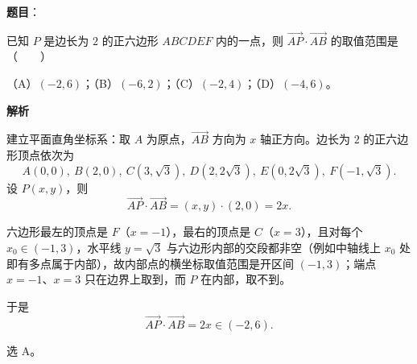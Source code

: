 \begin{answer}

\textbf{题目}：

已知 $P$ 是边长为 $2$ 的正六边形 $ABCDEF$ 内的一点，则 $\overrightarrow{AP}\cdot\overrightarrow{AB}$ 的取值范围是\mbox{（　　）}

（A）$(-2,6)$；（B）$(-6,2)$；（C）$(-2,4)$；（D）$(-4,6)$。

\textbf{解析}

建立平面直角坐标系：取 $A$ 为原点，$\overrightarrow{AB}$ 方向为 $x$ 轴正方向。边长为 $2$ 的正六边形顶点依次为
\nopagebreak[4]
\[A(0,0),\ B(2,0),\ C(3,\sqrt3),\ D(2,2\sqrt3),\ E(0,2\sqrt3),\ F(-1,\sqrt3).\]
设 $P(x,y)$，则
\nopagebreak[4]
\[\overrightarrow{AP}\cdot\overrightarrow{AB}=(x,y)\cdot(2,0)=2x .\]

六边形最左的顶点是 $F$（$x=-1$），最右的顶点是 $C$（$x=3$），且对每个 $x_0\in(-1,3)$，水平线 $y=\sqrt3$ 与六边形内部的交段都非空（例如中轴线上 $x_0$ 处即有多点属于内部），故内部点的横坐标取值范围是开区间 $(-1,3)$；端点 $x=-1$、$x=3$ 只在边界上取到，而 $P$ 在内部，取不到。

于是
\nopagebreak[4]
\[\overrightarrow{AP}\cdot\overrightarrow{AB}=2x\in(-2,6).\]

选 A。


\end{answer}

